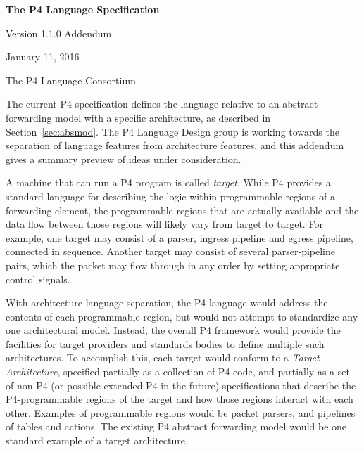 \documentclass[12pt]{article}
\begin{document}
\vspace{2cm}

\centerline{\sffamily\bfseries\huge The P4 Language Specification}
\vspace{3mm}
\centerline{\sffamily\Large Version 1.1.0 Addendum}
\vspace{3mm}
\centerline{\sffamily\large January 11, 2016}
\vspace{8mm}
\centerline{\sffamily\large The P4 Language Consortium}

\date{January 11, 2016}
\thispagestyle{firstpagestyle}



The current P4 specification defines the language relative to an
abstract forwarding model with a specific architecture, as described
in Section~\ref{sec:absmod}.  The P4 Language Design group is working
towards the separation of language features from architecture features,
and this addendum gives a summary preview of ideas under consideration.

A machine that can run a P4 program is called \textit{target}.
While P4 provides a standard language for describing the logic within
programmable regions of a forwarding element, the programmable regions that are
actually available and the data flow between those regions will likely vary
from target to target.  For example, one target may consist of a parser,
ingress \matchaction pipeline and egress \matchaction pipeline, connected in
sequence.  Another target may consist of several parser-pipeline pairs,
which the packet may flow through in any order by setting appropriate
control signals.

With architecture-language separation, the P4 language would address
the contents of each programmable region, but would not attempt to standardize
any one architectural model. Instead, the overall P4 framework would provide
the facilities for target providers and standards bodies to define multiple
such architectures.  To accomplish this, each target would conform to a
\textit{Target Architecture}, specified partially as a collection of
P4 code, and partially as a set of non-P4 (or possible extended P4
in the future) specifications that describe the P4-programmable regions of
the target and how those regions interact with each other. Examples of
programmable regions would be packet parsers, and pipelines of tables
and actions.  The existing P4 abstract forwarding model would be one standard
example of a target architecture.
\end{document}
